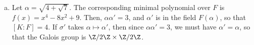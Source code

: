 \documentclass[10pt]{mypackage}
\begin{document}
\begin{enumerate}[(a)]
    Since $f(x)$ is irreducible, the operation of $G = \gal\left( K/F \right)$ on the roots of $f$ is transitive. There is an element $\sigma'$ of $G$ that takes $\alpha\mapsto \alpha'$, so since $\alpha^2 = 2 + \sqrt{2}$ and $\alpha'^2 = 2-\sqrt{2}$, we have $\sigma'$ takes $\sqrt{2}\mapsto -\sqrt{2}$ and $\alpha\alpha' \mapsto -\alpha\alpha'$. In particular, this means that $\alpha'\mapsto -\alpha$, so that $\sigma' = \sigma$, where $\sigma$ is the permutation from part (a), so that $\gal\left( K/F \right)\cong \Z/4\Z$.
  \item Let $\alpha = \sqrt{4 + \sqrt{7}}$. The corresponding minimal polynomial over $F$ is $f(x) = x^4 - 8x^2 + 9$. Then, $\alpha\alpha' = 3$, and $\alpha'$ is in the field $F\left( \alpha \right)$, so that $\left[ K:F \right] = 4$. If $\sigma'$ takes $\alpha\mapsto \alpha'$, then since $\alpha\alpha' = 3$, we must have $\alpha' = \alpha$, so that the Galois group is $\Z/2\Z\times\Z/2\Z$.
\end{enumerate}
\end{document}
